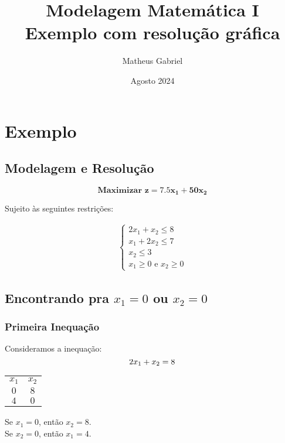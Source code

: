 \documentclass{article}
\title{Modelagem Matemática I\\
    \large Exemplo com resolução gráfica}
\author{Matheus Gabriel}
\date{Agosto 2024}
\begin{document}
\maketitle

\section{Exemplo}

\subsection{Modelagem e Resolução}

\begin{equation}
    \mathbf{\text{Maximizar } z = 7.5x_1 + 50x_2}
\end{equation}

Sujeito às seguintes restrições:


\begin{align*}
\begin{cases}
    2x_1 + x_2 \leq 8 \\
    x_1 + 2x_2 \leq 7 \\
    x_2 \leq 3 \\
    x_1 \geq 0 \text{ e } x_2 \geq 0
\end{cases}
\end{align*}


\subsection{Encontrando pra $x_1 = 0$ ou $x_2 = 0$}

\begin{tcolorbox}[colback=yellow!10, colframe=red!50!black, title=Importante!]
\end{tcolorbox}

\subsubsection{Primeira Inequação}

Consideramos a inequação:
\begin{equation}
    2x_1 + x_2 = 8 \\    
\end{equation}
\begin{table}[h]
    \centering
    \begin{tabular}{c|c}
        $x_1$ & $x_2$ \\
        $0$ & $8$ \\
        $4$ & $0$
    \end{tabular}
\end{table}
Se $x_1 = 0$, então $x_2 = 8$. \\
Se $x_2 = 0$, então $x_1 = 4$.
\end{document}
